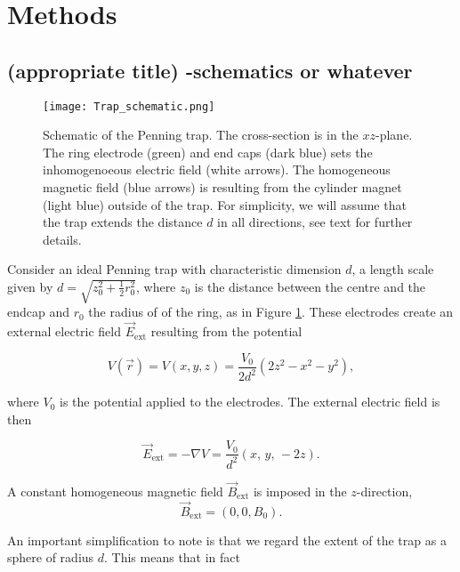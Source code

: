\section{Methods}\label{sec:methods}


\subsection{(appropriate title) -schematics or whatever}



\begin{figure}[h!]
    \texttt{[image: Trap\_schematic.png]}
    \caption{Schematic of the Penning trap. The cross-section is in the $xz$-plane. The ring electrode (green) and end caps (dark blue) sets the inhomogenoeous electric field (white arrows). The homogeneous magnetic field (blue arrows) is resulting from the cylinder magnet (light blue) outside of the trap. For simplicity, we will assume that the trap extends the distance $d$ in all directions, see text for further details.}
    \label{fig:schematic_trap}
\end{figure}


Consider an ideal Penning trap with characteristic dimension $d$, a length scale given by $d= \sqrt{z_0^2+ \frac{1}{2}r_0^2}$, where $z_0$ is the distance between the centre and the endcap and $r_0$ the radius of of the ring, as in Figure \ref{fig:schematic_trap}. These electrodes create an external electric field $\vec{E}_\mathrm{ext}$ resulting from the potential

\begin{equation}
    V (\vec{r})= V(x,y,z) = \frac{V_0}{2d^2}(2z^2 - x^2 - y^2), \label{eq:penning_potential}
\end{equation}

where $V_0$ is the potential applied to the electrodes. The external electric field is then 

\begin{equation}
    \vec{E}_\mathrm{ext} = -\nabla V = \frac{V_0}{d^2} (x,\,y,\,-2z). \label{eq:p1_E_field_pot_gradient}
\end{equation}

A constant homogeneous magnetic field $\vec{B}_\mathrm{ext}$ is imposed in the $z$-direction,
\begin{equation}
    \vec{B}_\mathrm{ext} = (0,0,B_0). \label{eq:homogeneous_B_field}
\end{equation}

An important simplification to note is that we regard the extent of the trap as a sphere of radius $d$. This means that in fact

